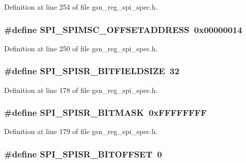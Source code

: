Definition at line 254 of file gsn\_\-reg\_\-spi\_\-spec.h.

\hypertarget{a00573_a18b229ab4c2e569746670650be4cf72a}{
\subsubsection[{SPI\_\-SPIMSC\_\-OFFSETADDRESS}]{\setlength{\rightskip}{0pt plus 5cm}\#define SPI\_\-SPIMSC\_\-OFFSETADDRESS~0x00000014}}
\label{a00573_a18b229ab4c2e569746670650be4cf72a}


Definition at line 250 of file gsn\_\-reg\_\-spi\_\-spec.h.

\hypertarget{a00573_a14002a8968e489d283279b1ac1d602d5}{
\subsubsection[{SPI\_\-SPISR\_\-BITFIELDSIZE}]{\setlength{\rightskip}{0pt plus 5cm}\#define SPI\_\-SPISR\_\-BITFIELDSIZE~32}}
\label{a00573_a14002a8968e489d283279b1ac1d602d5}


Definition at line 178 of file gsn\_\-reg\_\-spi\_\-spec.h.

\hypertarget{a00573_a1028f570efd47ca92d4164ff1d6217ab}{
\subsubsection[{SPI\_\-SPISR\_\-BITMASK}]{\setlength{\rightskip}{0pt plus 5cm}\#define SPI\_\-SPISR\_\-BITMASK~0xFFFFFFFF}}
\label{a00573_a1028f570efd47ca92d4164ff1d6217ab}


Definition at line 179 of file gsn\_\-reg\_\-spi\_\-spec.h.

\hypertarget{a00573_a383ac627129114ff62c14f496d720d80}{
\subsubsection[{SPI\_\-SPISR\_\-BITOFFSET}]{\setlength{\rightskip}{0pt plus 5cm}\#define SPI\_\-SPISR\_\-BITOFFSET~0}}
\label{a00573_a383ac627129114ff62c14f496d720d80}


